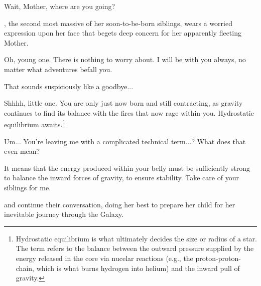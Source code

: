 \documentclass[main.tex]{subfiles}
\begin{document}
\par \Maia Wait, Mother, where are you going?  

\par \nar \rmmaia, the second most massive of her soon-to-be-born siblings, wears a worried expression upon her face that begets deep concern for her apparently fleeting Mother.  





\par \Pleione Oh, young one.  There is nothing to worry about.  I will be with you always, no matter what adventures befall you.  

\par \Maia That sounds suspiciously like a goodbye...

\par \Pleione Shhhh, little one.  You are only just now born and still contracting, as gravity continues to find its balance with the fires that now rage within you.  Hydrostatic equilibrium awaits.\footnote{Hydrostatic equilibrium is what ultimately decides the size or radius of a star.  The term refers to the balance between the outward pressure supplied by the energy released in the core via nucelar reactions (e.g., the proton-proton-chain, which is what burns hydrogen into helium) and the inward pull of gravity.}

\par \Maia Um... You're leaving me with a complicated technical term...?  What does that even mean?

\par \Pleione It means that the energy produced within your belly must be sufficiently strong to balance the inward forces of gravity, to ensure stability.  Take care of your siblings for me.

\par \nar \rmmaia and \rmpleione continue their conversation, \rmpleione doing her best to prepare her child for her inevitable journey through the Galaxy.
\end{document}
